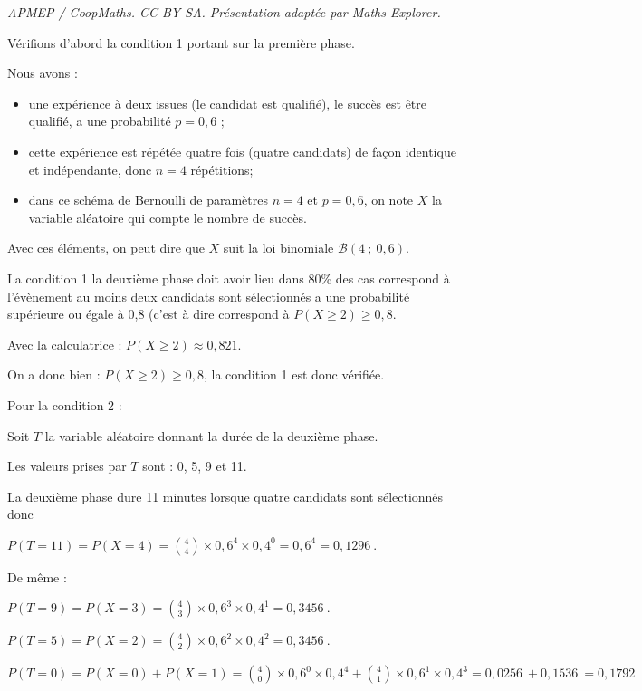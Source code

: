 \documentclass[10pt]{article}
\providecommand{\np}[2][]{{#2~#1}}
\begin{document}
\noindent\textit{APMEP / CoopMaths. CC BY-SA. Présentation adaptée par Maths Explorer.}\par\medskip
\bigskip

Vérifions d'abord la condition 1 portant sur la première phase.

Nous avons :
\begin{itemize}
\item une expérience à deux issues (le candidat est qualifié), le succès est \og être qualifié\fg{}, a une probabilité $p = 0,6$ ;
\item cette expérience est répétée quatre fois (quatre candidats) de façon identique et indépendante, donc $n=4$ répétitions;
\item dans ce schéma de Bernoulli de paramètres $n=4$ et $p=0,6$, on note $X$ la variable aléatoire qui compte le nombre de succès.
\end{itemize}

Avec ces éléments, on peut dire que $X$ suit la loi binomiale $ \mathcal{B}\left(4 ~;~ 0,6\right)$.

La condition 1 \og la deuxième phase doit avoir lieu dans 80\% des cas \fg{} correspond à l'évènement \og au moins deux candidats sont sélectionnés \fg{} a une probabilité supérieure ou égale à 0,8 (c'est à dire correspond à $P(X \geqslant 2)\geqslant 0,8$.

Avec la calculatrice : $\displaystyle P(X \geqslant  2)  \approx 0,821$.

On a donc bien : $P(X \geqslant 2)\geqslant 0,8$, la condition 1 est donc vérifiée.

\bigskip 

Pour la condition 2 :

Soit $T$ la variable aléatoire donnant la durée de la deuxième phase.

Les valeurs prises par $T$ sont : 0, 5, 9 et 11.

La deuxième phase dure 11 minutes lorsque quatre candidats sont sélectionnés donc

 $P(T=11)=P(X=4)= \binom{4}{4}\times 0,6^4\times 0,4^{0}=0,6^4= \np{0,1296}$.

De même :

$P(T=9)=P(X=3)= \binom{4}{3}\times 0,6^3\times 0,4^1= \np{0,3456}$.

$P(T=5)=P(X=2)= \binom{4}{2}\times 0,6^2\times 0,4^2= \np{0,3456}$.

$P(T=0)=P(X=0)+P(X=1)= \binom{4}{0}\times 0,6^0\times 0,4^4+ \binom{4}{1}\times 0,6^1\times 0,4^3= \np{0,0256} + \np{0,1536} = \np{0,1792}$
\end{document}
